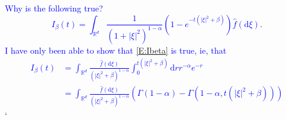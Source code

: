\documentclass[a4paper,11pt]{article}
\numberwithin{equation}{section}
\theoremstyle{plain}
\theoremstyle{definition}
\newcommand{\ud}{\ensuremath{\mathrm{d} }}
\newcommand{\R}{\mathbb{R}}
\numberwithin{NQ}{section}
\numberwithin{LQ}{section}
\numberwithin{ZQ}{section}
\begin{document}
\textcolor{blue}{Why is the following true?
	\[
	I_{\beta}(t) = \int_{\R^d} \frac{1}{(1 + |\xi|^2)^{1-\alpha}}\left( 1 - e^{-t(|\xi|^2 + \beta)} \right) \hat{f}(\ud \xi).
	\]
I have only been able to show that \eqref{E:Ibeta} is true, ie, that
\begin{align*}
	I_{\beta}(t) &= \int_{\R^d}  \frac{\widehat{f}(\ud \xi)}{(|\xi|^2 + \beta)^{1-\alpha} } \int_0^{t(|\xi|^2 + \beta)} \ud r r^{-\alpha} e^{-r} \\
	&= \int_{\R^d}  \frac{\widehat{f}(\ud \xi)}{(|\xi|^2 + \beta)^{1-\alpha} } \left( \Gamma(1 - \alpha) - \Gamma(1 - \alpha,t(|\xi|^2 + \beta) ) \right)
\end{align*}
}
`
\end{document}
